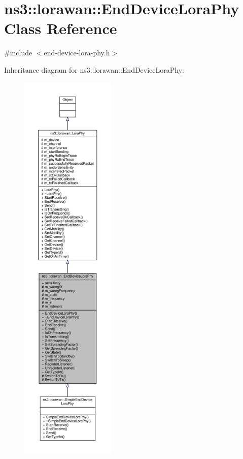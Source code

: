 \hypertarget{classns3_1_1lorawan_1_1EndDeviceLoraPhy}{}\section{ns3\+:\+:lorawan\+:\+:End\+Device\+Lora\+Phy Class Reference}
\label{classns3_1_1lorawan_1_1EndDeviceLoraPhy}


{\ttfamily \#include $<$end-\/device-\/lora-\/phy.\+h$>$}



Inheritance diagram for ns3\+:\+:lorawan\+:\+:End\+Device\+Lora\+Phy\+:
\nopagebreak
\begin{figure}[H]
\begin{center}
\leavevmode
\includegraphics[height=550pt]{classns3_1_1lorawan_1_1EndDeviceLoraPhy__inherit__graph}
\end{center}
\end{figure}


